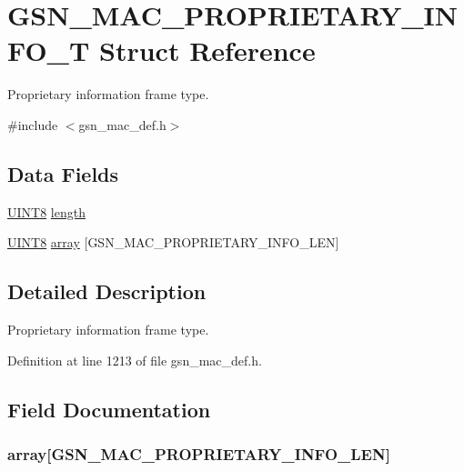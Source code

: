 \hypertarget{a00123}{
\section{GSN\_\-MAC\_\-PROPRIETARY\_\-INFO\_\-T Struct Reference}
\label{a00123}
}


Proprietary information frame type.  




{\ttfamily \#include $<$gsn\_\-mac\_\-def.h$>$}

\subsection*{Data Fields}
\begin{DoxyCompactItemize}
\item 
\hyperlink{a00660_gab27e9918b538ce9d8ca692479b375b6a}{UINT8} \hyperlink{a00123_ae360fb41f422c7c83b87d9af070cbd31}{length}
\item 
\hyperlink{a00660_gab27e9918b538ce9d8ca692479b375b6a}{UINT8} \hyperlink{a00123_a4c072df11832506fceb412aa2993d9c5}{array} \mbox{[}GSN\_\-MAC\_\-PROPRIETARY\_\-INFO\_\-LEN\mbox{]}
\end{DoxyCompactItemize}


\subsection{Detailed Description}
Proprietary information frame type. 

Definition at line 1213 of file gsn\_\-mac\_\-def.h.



\subsection{Field Documentation}
\hypertarget{a00123_a4c072df11832506fceb412aa2993d9c5}{
\subsubsection[{array}]{ {\bf array}\mbox{[}GSN\_\-MAC\_\-PROPRIETARY\_\-INFO\_\-LEN\mbox{]}}}
\label{a00123_a4c072df11832506fceb412aa2993d9c5}


